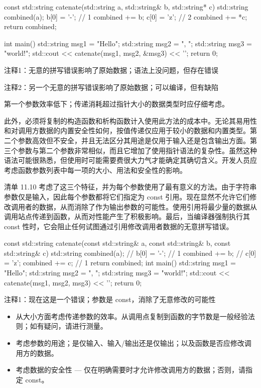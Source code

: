 
\begin{cpp}
const std::string catenate(std::string a, std::string& b, std::string* c) {
  std::string combined(a);
  b[0] = '-'; // 1
  combined += b;
  c[0] = 'z'; // 2
  combined += *c;
  return combined;
}

int main() {
  std::string msg1 = "Hello";
  std::string msg2 = ", ";
  std::string msg3 = "world!";
  std::cout << catenate(msg1, msg2, &msg3) << '\n';
  return 0;
}
\end{cpp}

{\footnotesize
注释1：无意的拼写错误影响了原始数据；语法上没问题，但存在错误

注释2：另一个无意的拼写错误影响了原始数据；可以编译，但有缺陷
}


第一个参数效率低下；传递消耗超过指针大小的数据类型时应仔细考虑。

此外，必须将复制的构造函数和析构函数计入使用此方法的成本中。无论其易用性和对调用方数据的内置安全性如何，按值传递仅应用于较小的数据和内置类型。第二个参数高效但不安全，并且无法区分其用途是仅用于输入还是包含输出方面。第三个参数与第二个参数非常相似，而且它增加了使用指针语法的复杂性。虽然这种语法可能很熟悉，但使用时可能需要费很大力气才能确定其确切含义。开发人员应考虑函数参数列表中每一项的大小、用法和安全性的影响。


清单 11.10 考虑了这三个特征，并为每个参数使用了最有意义的方法。由于字符串参数仅是输入，因此每个参数都将它们指定为 const 引用。现在显然不允许它们修改调用者的数据，从而消除了作为输出参数的可能性。使用引用将最少量的数据从调用站点传递到函数，从而对性能产生了积极影响。最后，当编译器强制执行其 const 性时，它会阻止任何试图通过引用修改调用者数据的无意拼写错误。


\begin{cpp}
const std::string catenate(const std::string& a, const std::string& b, const
std::string& c) {
  std::string combined(a);
  // b[0] = '-'; // 1
  combined += b;
  // c[0] = 'z';
  combined += c; // 1
  return combined;
}
int main() {
  std::string msg1 = "Hello";
  std::string msg2 = ", ";
  std::string msg3 = "world!";
  std::cout << catenate(msg1, msg2, msg3) << '\n';
  return 0;
}
\end{cpp}

{\footnotesize
注释1：现在这是一个错误；参数是 const，消除了无意修改的可能性
}


\begin{itemize}
\item
从大小方面考虑传递参数的效率。从调用点复制到函数的字节数是一般经验法则；如有疑问，请进行测量。

\item
考虑参数的用途；是仅输入、输入/输出还是仅输出；以及函数是否应修改调用方的数据。

\item
考虑数据的安全性 — 仅在明确需要时才允许修改调用方的数据；否则，请指定 const。
\end{itemize}









